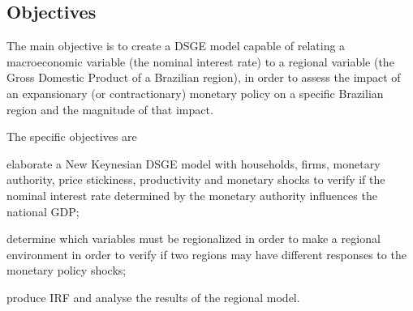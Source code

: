 \documentclass[../thesis.tex]{subfiles}
\begin{document}
	\subsection*{Objectives}
	
	The main objective is to create a DSGE model capable of relating a macroeconomic variable (the nominal interest rate) to a regional variable (the Gross Domestic Product of a Brazilian region), in order to assess the impact of an expansionary (or contractionary) monetary policy on a specific Brazilian region and the magnitude of that impact.
	
	The specific objectives are 
	\begin{enumerate*}[label=(\arabic*)]
		\item elaborate a New Keynesian DSGE model with households, firms, monetary authority, price stickiness, productivity and monetary shocks to verify if the nominal interest rate determined by the monetary authority influences the national GDP; 
		\item determine which variables must be regionalized in order to make a regional environment in order to verify if two regions may have different responses to the monetary policy shocks; 
		\item produce IRF and analyse the results of the regional model.
	\end{enumerate*}	
\end{document}
